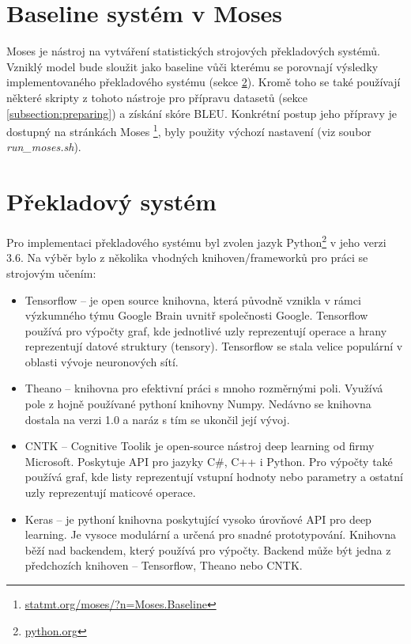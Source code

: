 \section{Baseline systém v Moses}\label{section:baseline}
Moses \cite{moses} je nástroj na vytváření statistických strojových překladových systémů. Vzniklý model bude sloužit jako baseline vůči kterému se porovnají výsledky implementovaného překladového systému (sekce \ref{section:nmtSystem}). Kromě toho se také používají některé skripty z tohoto nástroje pro přípravu datasetů (sekce \ref{subsection:preparing}) a získání skóre BLEU. Konkrétní postup jeho přípravy je dostupný na stránkách Moses \footnote{\url{statmt.org/moses/?n=Moses.Baseline}}, byly použity výchozí nastavení (viz soubor \emph{run\_moses.sh}). 


\section{Překladový systém}\label{section:nmtSystem}
Pro implementaci překladového systému byl zvolen jazyk Python\footnote{\url{python.org}} v jeho verzi 3.6. Na výběr bylo z několika vhodných knihoven/frameworků pro práci se strojovým učením:

\begin{itemize}
  \item Tensorflow -- je open source knihovna, která původně vznikla v rámci výzkumného týmu Google Brain uvnitř společnosti Google. Tensorflow používá pro výpočty graf, kde jednotlivé uzly reprezentují operace a hrany reprezentují datové struktury (tensory). Tensorflow se stala velice populární v oblasti vývoje neuronových sítí.
  \item Theano -- knihovna pro efektivní práci s mnoho rozměrnými poli. Využívá pole z hojně používané pythoní knihovny Numpy. Nedávno se knihovna dostala na verzi 1.0 a naráz s tím se ukončil její vývoj.
  \item CNTK -- Cognitive Toolik je open-source nástroj deep learning od firmy Microsoft. Poskytuje API pro jazyky C\#, C++ i Python. Pro výpočty také používá graf, kde listy reprezentují vstupní hodnoty nebo parametry a ostatní uzly reprezentují maticové operace.
  \item Keras -- je pythoní knihovna poskytující vysoko úrovňové API pro deep learning. Je vysoce modulární a určená pro snadné prototypování. Knihovna běží nad backendem, který používá pro výpočty. Backend může být jedna z předchozích knihoven -- Tensorflow, Theano nebo CNTK.
\end{itemize}


